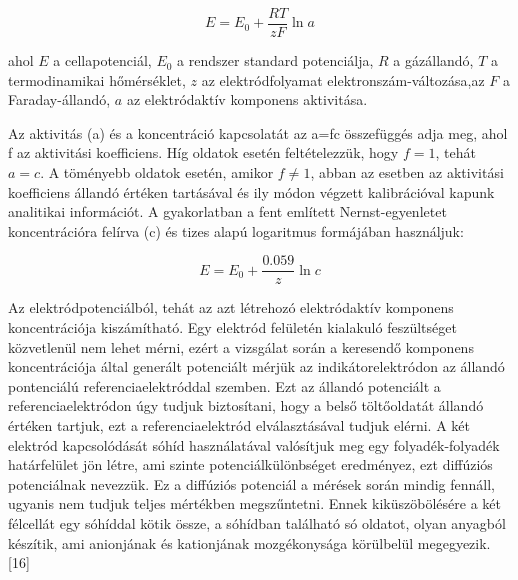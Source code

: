 \begin{equation}
E = E_\text{0} + \frac{RT}{zF} \ln a
\end{equation}

ahol $E$ a cellapotenciál, $E_\text{0}$ a rendszer standard potenciálja, $R$ a gázállandó, $T$ a termodinamikai hőmérséklet, $z$ az elektródfolyamat elektronszám-változása,az $F$ a Faraday-állandó, $a$ az elektródaktív komponens aktivitása.

Az aktivitás (a) és a koncentráció kapcsolatát az a=fc összefüggés adja meg, ahol f az aktivitási koefficiens. Híg oldatok esetén feltételezzük, hogy $f=1$, tehát $a=c$. A töményebb oldatok esetén, amikor $f\neq 1$, abban az esetben az aktivitási koefficiens állandó értéken tartásával és ily módon végzett kalibrációval kapunk analitikai információt. A gyakorlatban a fent említett Nernst-egyenletet koncentrációra felírva (c) és tizes alapú logaritmus formájában használjuk:

\begin{equation}
E= E_\text{0} + \frac{0.059}{z} \ln c
\end{equation}

Az elektródpotenciálból, tehát az azt létrehozó elektródaktív komponens koncentrációja kiszámítható. Egy elektród felületén kialakuló feszültséget közvetlenül nem lehet mérni, ezért a vizsgálat során a keresendő komponens koncentrációja által generált potenciált mérjük az indikátorelektródon az állandó pontenciálú referenciaelektróddal szemben. Ezt az állandó potenciált a referenciaelektródon úgy tudjuk biztosítani, hogy a belső töltőoldatát állandó értéken tartjuk, ezt a referenciaelektród elválasztásával tudjuk elérni. A két elektród kapcsolódását sóhíd használatával valósítjuk meg egy folyadék-folyadék határfelület jön létre, ami szinte potenciálkülönbséget eredményez, ezt diffúziós potenciálnak nevezzük. Ez a diffúziós potenciál a mérések során mindig fennáll, ugyanis nem tudjuk teljes mértékben megszűntetni. Ennek kiküszöbölésére a két félcellát egy sóhíddal kötik össze, a sóhídban található só oldatot, olyan anyagból készítik, ami anionjának és kationjának mozgékonysága körülbelül megegyezik. [16]


